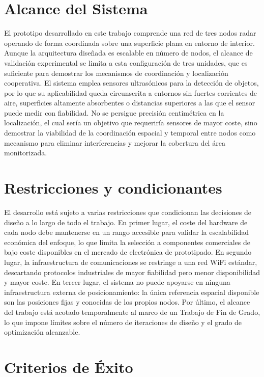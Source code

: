 \section{Alcance del Sistema}

El prototipo desarrollado en este trabajo comprende una red de tres nodos radar operando de forma coordinada sobre una superficie plana en entorno de interior. Aunque la arquitectura diseñada es escalable en número de nodos, el alcance de validación experimental se limita a esta configuración de tres unidades, que es suficiente para demostrar los mecanismos de coordinación y localización cooperativa. El sistema emplea sensores ultrasónicos para la detección de objetos, por lo que su aplicabilidad queda circunscrita a entornos sin fuertes corrientes de aire, superficies altamente absorbentes o distancias superiores a las que el sensor puede medir con fiabilidad. No se persigue precisión centimétrica en la localización, el cual sería un objetivo que requeriría sensores de mayor coste, sino demostrar la viabilidad de la coordinación espacial y temporal entre nodos como mecanismo para eliminar interferencias y mejorar la cobertura del área monitorizada.

\section{Restricciones y condicionantes}

El desarrollo está sujeto a varias restricciones que condicionan las decisiones de diseño a lo largo de todo el trabajo. En primer lugar, el coste del hardware de cada nodo debe mantenerse en un rango accesible para validar la escalabilidad económica del enfoque, lo que limita la selección a componentes comerciales de bajo coste disponibles en el mercado de electrónica de prototipado. En segundo lugar, la infraestructura de comunicaciones se restringe a una red WiFi estándar, descartando protocolos industriales de mayor fiabilidad pero menor disponibilidad y mayor coste. En tercer lugar, el sistema no puede apoyarse en ninguna infraestructura externa de posicionamiento: la única referencia espacial disponible son las posiciones fijas y conocidas de los propios nodos. Por último, el alcance del trabajo está acotado temporalmente al marco de un Trabajo de Fin de Grado, lo que impone límites sobre el número de iteraciones de diseño y el grado de optimización alcanzable.

\section{Criterios de Éxito}

